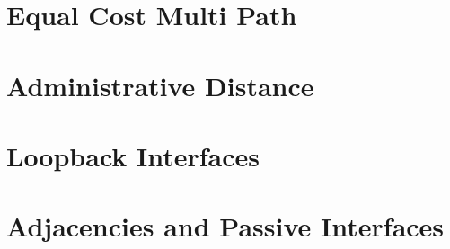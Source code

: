 \documentclass[pdflatex,compress,mathserif]{beamer}
\begin{document}
\section{Equal Cost Multi Path}

\section{Administrative Distance}

\section{Loopback Interfaces}

\section{Adjacencies and Passive Interfaces}
\end{document}

